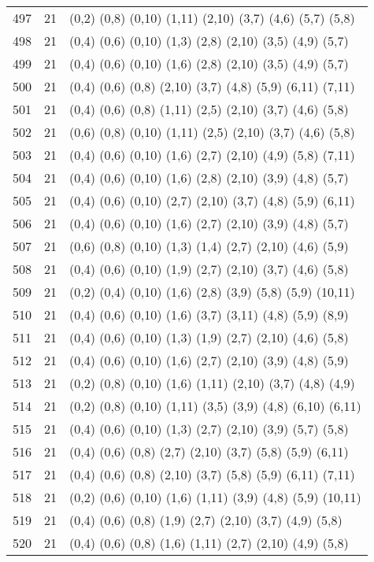 {\begin{longtable}{lll}
497 & 21 & (0,2) (0,8) (0,10) (1,11) (2,10) (3,7) (4,6) (5,7) (5,8) \\
498 & 21 & (0,4) (0,6) (0,10) (1,3) (2,8) (2,10) (3,5) (4,9) (5,7) \\
499 & 21 & (0,4) (0,6) (0,10) (1,6) (2,8) (2,10) (3,5) (4,9) (5,7) \\
500 & 21 & (0,4) (0,6) (0,8) (2,10) (3,7) (4,8) (5,9) (6,11) (7,11) \\
501 & 21 & (0,4) (0,6) (0,8) (1,11) (2,5) (2,10) (3,7) (4,6) (5,8) \\
502 & 21 & (0,6) (0,8) (0,10) (1,11) (2,5) (2,10) (3,7) (4,6) (5,8) \\
503 & 21 & (0,4) (0,6) (0,10) (1,6) (2,7) (2,10) (4,9) (5,8) (7,11) \\
504 & 21 & (0,4) (0,6) (0,10) (1,6) (2,8) (2,10) (3,9) (4,8) (5,7) \\
505 & 21 & (0,4) (0,6) (0,10) (2,7) (2,10) (3,7) (4,8) (5,9) (6,11) \\
506 & 21 & (0,4) (0,6) (0,10) (1,6) (2,7) (2,10) (3,9) (4,8) (5,7) \\
507 & 21 & (0,6) (0,8) (0,10) (1,3) (1,4) (2,7) (2,10) (4,6) (5,9) \\
508 & 21 & (0,4) (0,6) (0,10) (1,9) (2,7) (2,10) (3,7) (4,6) (5,8) \\
509 & 21 & (0,2) (0,4) (0,10) (1,6) (2,8) (3,9) (5,8) (5,9) (10,11) \\
510 & 21 & (0,4) (0,6) (0,10) (1,6) (3,7) (3,11) (4,8) (5,9) (8,9) \\
511 & 21 & (0,4) (0,6) (0,10) (1,3) (1,9) (2,7) (2,10) (4,6) (5,8) \\
512 & 21 & (0,4) (0,6) (0,10) (1,6) (2,7) (2,10) (3,9) (4,8) (5,9) \\
513 & 21 & (0,2) (0,8) (0,10) (1,6) (1,11) (2,10) (3,7) (4,8) (4,9) \\
514 & 21 & (0,2) (0,8) (0,10) (1,11) (3,5) (3,9) (4,8) (6,10) (6,11) \\
515 & 21 & (0,4) (0,6) (0,10) (1,3) (2,7) (2,10) (3,9) (5,7) (5,8) \\
516 & 21 & (0,4) (0,6) (0,8) (2,7) (2,10) (3,7) (5,8) (5,9) (6,11) \\
517 & 21 & (0,4) (0,6) (0,8) (2,10) (3,7) (5,8) (5,9) (6,11) (7,11) \\
518 & 21 & (0,2) (0,6) (0,10) (1,6) (1,11) (3,9) (4,8) (5,9) (10,11) \\
519 & 21 & (0,4) (0,6) (0,8) (1,9) (2,7) (2,10) (3,7) (4,9) (5,8) \\
520 & 21 & (0,4) (0,6) (0,8) (1,6) (1,11) (2,7) (2,10) (4,9) (5,8) \\

\end{longtable}}
